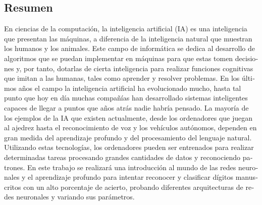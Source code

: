 \begin{otherlanguage}{spanish}

	\chapter*{Resumen}
	\setcounter{chapter}{-2}

	En ciencias de la computación, la inteligencia artificial (IA) es una inteligencia que presentan las máquinas, a diferencia de la inteligencia natural que muestran los humanos y los animales. Este campo de informática se dedica al desarrollo de algoritmos que se puedan implementar en máquinas para que estas tomen decisiones y, por tanto, dotarlas de cierta inteligencia para realizar funciones cognitivas que imitan a las humanas, tales como aprender y resolver problemas. En los últimos años el campo la inteligencia artificial ha evolucionado mucho, hasta tal punto que hoy en día muchas compañías han desarrollado sistemas inteligentes capaces de llegar a puntos que años atrás nadie habría pensado. La mayoría de los ejemplos de la IA que existen actualmente, desde los ordenadores que juegan al ajedrez hasta el reconocimiento de voz y los vehículos autónomos, dependen en gran medida del aprendizaje profundo y del procesamiento del lenguaje natural. Utilizando estas tecnologías, los ordenadores pueden ser entrenados para realizar determinadas tareas procesando grandes cantidades de datos y reconociendo patrones. En este trabajo se realizará una introducción al mundo de las redes neuronales y el aprendizaje profundo para intentar reconocer y clasificar dígitos manuscritos con un alto porcentaje de acierto, probando diferentes arquitecturas de redes neuronales y variando sus parámetros.

\end{otherlanguage}
